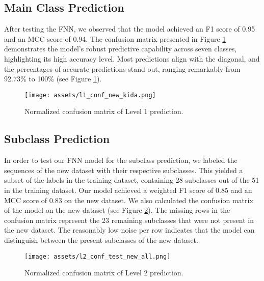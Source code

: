 \documentclass{bioinfo}
\begin{document}

\subsection{Main Class Prediction}
After testing the FNN, we observed that the model achieved an F1 score of 0.95 and an MCC score of 0.94. 
The confusion matrix presented in Figure \ref{fig:FNN_conf_l1} demonstrates the model's robust predictive capability across seven classes, 
highlighting its high accuracy level. Most predictions align with the diagonal, and the percentages of accurate predictions stand out, 
ranging remarkably from 92.73\% to 100\% (see Figure \ref{fig:FNN_conf_l1}).

\begin{figure}[!t]
\texttt{[image: assets/l1\_conf\_new\_kida.png]}
\caption{Normalized confusion matrix of Level 1 prediction.}\label{fig:FNN_conf_l1}
\end{figure}

\subsection{Subclass Prediction}
In order to test our FNN model for the subclass prediction, we labeled the sequences of the new dataset with their respective subclasses.
This yielded a subset of the labels in the training dataset, containing 28 subclasses out of the 51 in the training dataset.
Our model achieved a weighted F1 score of 0.85 and an MCC score of 0.83 on the new dataset. 
We also calculated the confusion matrix of the model on the new dataset (see Figure \ref{fig:FNN_conf_l2}).
The missing rows in the confusion matrix represent the 23 remaining subclasses that were not present in the new dataset.
The reasonably low noise per row indicates that the model can distinguish between the present subclasses of the new dataset.


\begin{figure}[!b]
\texttt{[image: assets/l2\_conf\_test\_new\_all.png]}
\caption{Normalized confusion matrix of Level 2 prediction.}\label{fig:FNN_conf_l2}
\end{figure}
\end{document}

